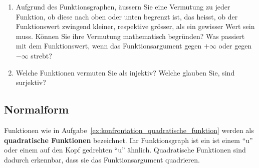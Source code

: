 \documentclass[12pt]{article}
\begin{document}
\begin{exercise}
\begin{enumerate}[label=\alph*)]
\item Aufgrund des Funktionsgraphen, äussern Sie eine Vermutung zu jeder Funktion, ob diese nach oben oder unten begrenzt ist, das heisst, ob der Funktionswert zwingend kleiner, respektive grösser, als ein gewisser Wert sein muss. Können Sie ihre Vermutung mathematisch begründen? Was passiert mit dem Funktionswert, wenn das Funktionsargument gegen $+\infty$ oder gegen $-\infty$ strebt?
\item Welche Funktionen vermuten Sie als injektiv? Welche glauben Sie, sind surjektiv?
\end{enumerate}
\end{exercise}


\subsection{Normalform}
Funktionen wie in Aufgabe~\ref{ex:konfrontation_quadratische_funktion} werden als \textbf{quadratische Funktionen} bezeichnet. Ihr Funktionsgraph ist ein ist einem ``u'' oder einem auf den Kopf gedrehten ``u'' ähnlich. Quadratische Funktionen sind dadurch erkennbar, dass sie das Funktionsargument quadrieren.
\end{document}
